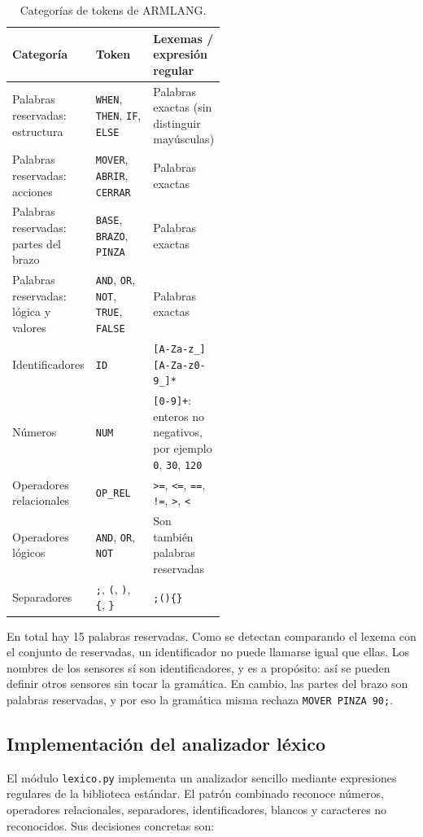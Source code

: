\documentclass[10pt,a4paper]{article}
\newcommand{\tm}[1]{\texttt{#1}}                                          %
\begin{document}
\begin{table}[H]
\centering\small
\begin{tabularx}{\linewidth}{|L{0.25\linewidth}|L{0.27\linewidth}|X|}
\hline
\textbf{Categoría} & \textbf{Token} & \textbf{Lexemas / expresión regular} \\
\hline
Palabras reservadas: estructura & \tm{WHEN}, \tm{THEN}, \tm{IF}, \tm{ELSE} & Palabras exactas (sin distinguir mayúsculas) \\
\hline
Palabras reservadas: acciones & \tm{MOVER}, \tm{ABRIR}, \tm{CERRAR} & Palabras exactas \\
\hline
Palabras reservadas: partes del brazo & \tm{BASE}, \tm{BRAZO}, \tm{PINZA} & Palabras exactas \\
\hline
Palabras reservadas: lógica y valores & \tm{AND}, \tm{OR}, \tm{NOT}, \tm{TRUE}, \tm{FALSE} & Palabras exactas \\
\hline
Identificadores & \tm{ID} & \tm{[A-Za-z\_][A-Za-z0-9\_]*} \\
\hline
Números & \tm{NUM} & \tm{[0-9]+}: enteros no negativos, por ejemplo \tm{0}, \tm{30}, \tm{120} \\
\hline
Operadores relacionales & \tm{OP\_REL} & \tm{>=}, \tm{<=}, \tm{==}, \tm{!=}, \tm{>}, \tm{<} \\
\hline
Operadores lógicos & \tm{AND}, \tm{OR}, \tm{NOT} & Son también palabras reservadas \\
\hline
Separadores & \tm{;}, \tm{(}, \tm{)}, \tm{\{}, \tm{\}} & \tm{;}\quad \tm{(}\quad \tm{)}\quad \tm{\{}\quad \tm{\}} \\
\hline
\end{tabularx}
\caption{Categorías de tokens de ARMLANG.}
\label{tab:tokens}
\end{table}

En total hay 15 palabras reservadas. Como se detectan comparando el lexema con el conjunto
de reservadas, un identificador no puede llamarse igual que ellas. Los nombres de los sensores
sí son identificadores, y es a propósito: así se pueden definir otros sensores sin tocar la
gramática. En cambio, las partes del brazo son palabras reservadas, y por eso la gramática
misma rechaza \tm{MOVER PINZA 90;}.

\subsection{Implementación del analizador léxico}

El módulo \tm{lexico.py} implementa un analizador sencillo mediante expresiones regulares de
la biblioteca estándar. El patrón combinado reconoce números, operadores relacionales,
separadores, identificadores, blancos y caracteres no reconocidos. Sus decisiones concretas son:
\end{document}
